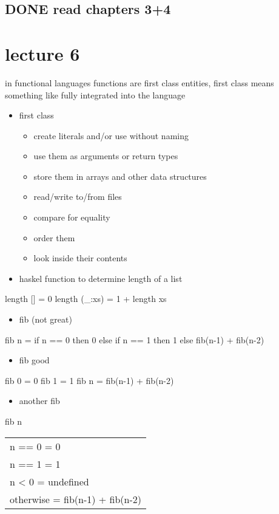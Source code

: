 \documentclass[11pt]{article}
\begin{document}
\subsection{{\bfseries\sffamily DONE} read chapters 3+4}
\label{sec-4-2}
\section{lecture 6}
\label{sec-5}
in functional languages functions are first class entities, first class means something like fully integrated into the
language
\begin{itemize}
\item first class
\begin{itemize}
\item create literals and/or use without naming
\item use them as arguments or return types
\item store them in arrays and other data structures
\item read/write to/from files
\item compare for equality
\item order them
\item look inside their contents
\end{itemize}
\item haskel function to determine length of a list
\end{itemize}
length [] = 0
length (\_:xs) = 1 + length xs
\begin{itemize}
\item fib (not great)
\end{itemize}
fib n = if n == 0
        then 0
        else if n == 1
             then 1
             else fib(n-1) + fib(n-2)
\begin{itemize}
\item fib good
\end{itemize}
fib 0 = 0
fib 1 = 1
fib n = fib(n-1) + fib(n-2)
\begin{itemize}
\item another fib
\end{itemize}
fib n
\begin{center}
\begin{tabular}{l}
n == 0    = 0\\
n == 1    = 1\\
n < 0     = undefined\\
otherwise = fib(n-1) + fib(n-2)\\
\end{tabular}
\end{center}
\end{document}
